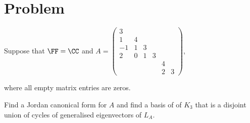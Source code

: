 \documentclass[11pt]{scrartcl}
\begin{document}
\section{Problem}

\begin{problem*}
\hfill

Suppose that $\FF = \CC$ and $A = \left(\begin{matrix}
    3 \\
    1&4 \\
    -1 & 1 & 3 \\
    2&0&1&3 \\
    &&&&4\\ &&&&2&3
\end{matrix}\right)$, 

  where all empty matrix entries are zeros.

  Find a Jordan canonical form for $A$ and find a basis of of $K_3$
  that is a disjoint union of cycles of generalised eigenvectors of
  $L_A$.
\end{problem*}
\end{document}
